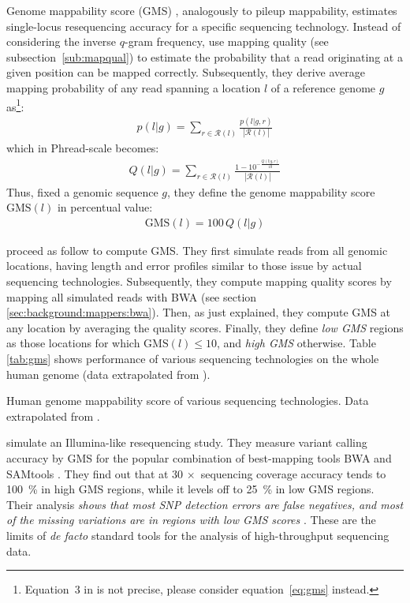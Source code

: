 Genome mappability score (GMS) \citep{Lee2012}, analogously to pileup mappability, estimates single-locus resequencing accuracy for a specific sequencing technology.
Instead of considering the inverse $q$-gram frequency, \citeauthor{Lee2012} use mapping quality (see subsection~\ref{sub:mapqual}) to estimate the probability that a read originating at a given position can be mapped correctly.
Subsequently, they derive average mapping probability of any read spanning a location $l$ of a reference genome $g$ as\footnote{Equation~3 in \citep{Lee2012} is not precise, please consider equation~\ref{eq:gms} instead.}:
\begin{eqnarray}
\label{eq:gms}
p(l|g) = \sum_{r \in \mathcal{R}(l)}{\frac{p(l|g,r)}{|\mathcal{R}(l)|}}
\end{eqnarray}
which in Phread-scale becomes:
\begin{eqnarray}
Q(l|g) = \sum_{r \in \mathcal{R}(l)}{\frac{1 - 10^{-\frac{Q(l|g,r)}{10}}}{|\mathcal{R}(l)|}}
\end{eqnarray}
Thus, fixed a genomic sequence $g$, they define the genome mappability score $\text{GMS}(l)$ in percentual value:
\begin{eqnarray}
\text{GMS}(l) = 100 \, Q(l|g)
\end{eqnarray}

\citeauthor{Lee2012} proceed as follow to compute GMS.
They first simulate reads from all genomic locations, having length and error profiles similar to those issue by actual sequencing technologies.
Subsequently, they compute mapping quality scores by mapping all simulated reads with BWA (see section \ref{sec:background:mappers:bwa}).
Then, as just explained, they compute GMS at any location by averaging the quality scores.
Finally, they define \emph{low GMS} regions as those locations for which $\text{GMS}(l) \leq 10$, and \emph{high GMS} otherwise.
Table \ref{tab:gms} shows performance of various sequencing technologies on the whole human genome (data extrapolated from \citep{Lee2012}).

\begin{table}[h]
\begin{center}
\caption[Human genome mappability score]{Human genome mappability score of various sequencing technologies. Data extrapolated from \citep{Lee2012}.}
\sffamily

\end{center}
\label{tab:gms}
\end{table}

\citeauthor{Lee2012} simulate an Illumina-like resequencing study.
They measure variant calling accuracy by GMS for the popular combination of best-mapping tools BWA and SAMtools \citep{Li2009a}.
They find out that at $30\,\times$ sequencing coverage accuracy tends to 100~\% in high GMS regions, while it levels off to 25~\% in low GMS regions.
Their analysis \emph{shows that most SNP detection errors are false negatives, and most of the missing variations are in regions with low GMS scores} \citep{Lee2012}.
These are the limits of \emph{de facto} standard tools for the analysis of high-throughput sequencing data.

